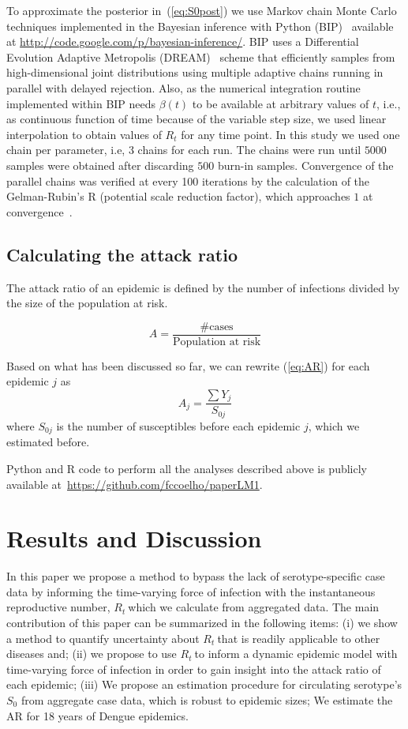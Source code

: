 \documentclass[10pt]{article}
\def \rr {$R_{t}\:$}
\begin{document}
To approximate the posterior in~(\ref{eq:S0post}) we use Markov chain Monte 
Carlo techniques implemented in the Bayesian inference with Python 
(BIP)~\cite{pone2011} available at  
\url{http://code.google.com/p/bayesian-inference/}.
BIP uses a Differential Evolution Adaptive Metropolis (DREAM)~\cite{vrugt2008} 
scheme that efficiently samples from high-dimensional joint distributions using 
multiple adaptive chains running in parallel with delayed rejection.
Also, as the numerical integration routine implemented within BIP needs 
$\beta(t)$ to be available at 
arbitrary values of $t$, i.e., as continuous function of time because of the 
variable step size, we used linear interpolation to obtain values of $R_t$ for 
any time point.
In this study we used one chain per parameter, i.e, 3 chains for each run.
The chains were run until $5000$ samples were obtained after discarding $500$ 
burn-in samples.
Convergence of the parallel chains was verified at every 100 iterations by the 
calculation of the Gelman-Rubin's R (potential scale 
reduction factor), which approaches $1$ at convergence~\cite{brooks1998}.

\subsection*{Calculating the attack ratio}

The attack ratio of an epidemic is defined by the number of infections divided 
by the size of the population at risk.

\begin{equation}
\label{eq:AR}
A=\frac{\text{\# cases}}{\text{Population at risk}} 
\end{equation}

Based on what has been discussed so far, we can rewrite (\ref{eq:AR}) for 
each epidemic $j$ as
\begin{equation}
\label{eq:AR2}
 A_{j}=\frac{\sum Y_j}{S_{0j}}
\end{equation}
where $S_{0j}$ is the number of susceptibles before each epidemic $j$, which we
estimated before.

Python and R code to perform all the analyses described above is publicly 
available at~\url{https://github.com/fccoelho/paperLM1}.

\section*{Results and Discussion}

In this paper we propose a method to bypass the lack of serotype-specific case 
data by informing the time-varying force of infection with the instantaneous 
reproductive number, \rr which we calculate from aggregated data.
The main contribution of this paper can be summarized in the following items: 
(i) we show a method to quantify uncertainty 
about \rr that is readily applicable to other diseases and; (ii) we propose to 
use \rr to inform a dynamic epidemic model with time-varying force of infection 
in order to gain insight into the attack ratio of each epidemic; (iii) We 
propose an estimation procedure for circulating serotype's $S_0$ from 
aggregate case data, which is robust to epidemic sizes; We estimate the AR 
for 18 years of Dengue epidemics. 
\end{document}
